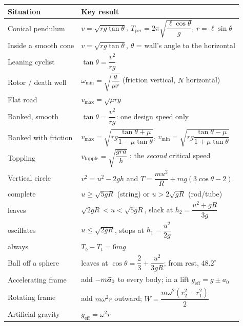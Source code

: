 \medskip
{\small\renewcommand{\arraystretch}{1.45}
\begin{center}
\begin{tabular}{@{}ll@{}}
\toprule
Situation & Key result\\
\midrule
Conical pendulum      & $v=\sqrt{rg\tan\theta}$, \; $T_{\text{per}}=2\pi\sqrt{\dfrac{\ell\cos\theta}{g}}$, \; $r=\ell\sin\theta$\\[3pt]
Inside a smooth cone  & $v=\sqrt{rg\tan\theta}$, $\theta$ = wall's angle to the horizontal\\[3pt]
Leaning cyclist       & $\tan\theta=\dfrac{v^{2}}{rg}$\\[3pt]
Rotor / death well    & $\omega_{\min}=\sqrt{\dfrac{g}{\mu r}}$ \; (friction vertical, $N$ horizontal)\\[3pt]
Flat road             & $v_{\max}=\sqrt{\mu rg}$\\[3pt]
Banked, smooth        & $\tan\theta=\dfrac{v^{2}}{rg}$: one design speed only\\[3pt]
Banked with friction  & $v_{\max}=\sqrt{rg\dfrac{\tan\theta+\mu}{1-\mu\tan\theta}}$, \;
                        $v_{\min}=\sqrt{rg\dfrac{\tan\theta-\mu}{1+\mu\tan\theta}}$\\[5pt]
Toppling              & $v_{\text{topple}}=\sqrt{\dfrac{gra}{h}}$ \;: the \emph{second} critical speed\\[4pt]
Vertical circle       & $v^{2}=u^{2}-2gh$ \;and\; $T=\dfrac{mu^{2}}{R}+mg(3\cos\theta-2)$\\[4pt]
\quad complete        & $u\ge\sqrt{5gR}$ \; (string) \quad or \quad $u>2\sqrt{gR}$ \; (rod/tube)\\[2pt]
\quad leaves          & $\sqrt{2gR}<u<\sqrt{5gR}$, slack at $h_2=\dfrac{u^{2}+gR}{3g}$\\[3pt]
\quad oscillates      & $u\le\sqrt{2gR}$, stops at $h_1=\dfrac{u^{2}}{2g}$\\[3pt]
\quad always          & $T_b-T_t=6mg$\\[3pt]
Ball off a sphere     & leaves at $\cos\theta=\dfrac23+\dfrac{u^{2}}{3gR}$; from rest, $48.2^\circ$\\[3pt]
Accelerating frame    & add $-m\vec{\bm{a}}_0$ to every body; in a lift $g_{\text{eff}}=g\pm a_0$\\[3pt]
Rotating frame        & add $m\omega^{2}r$ outward; $W=\dfrac{m\omega^{2}(r_2^{2}-r_1^{2})}{2}$\\[3pt]
Artificial gravity    & $g_{\text{eff}}=\omega^{2}r$\\
\bottomrule
\end{tabular}
\end{center}
}

